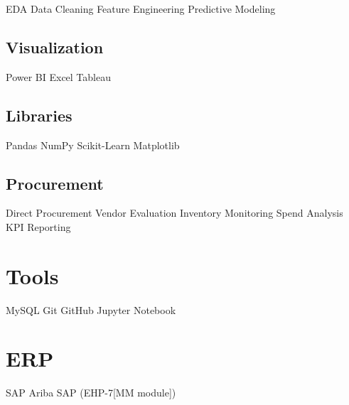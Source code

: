 \documentclass[]{deedy-resume-reversed}
\begin{document}
\begin{minipage}[t]{0.30\textwidth}
\textbullet{} EDA \textbullet{} Data Cleaning \textbullet{} Feature Engineering \textbullet{} Predictive Modeling

\sectionsep

\subsection{Visualization}

\textbullet{} Power BI \textbullet{} Excel \textbullet{} Tableau

\sectionsep

\subsection{Libraries}

\textbullet{} Pandas \textbullet{} NumPy \textbullet{} Scikit-Learn 
\textbullet{} Matplotlib

\sectionsep

\subsection{Procurement}

\textbullet{} Direct Procurement \textbullet{} Vendor Evaluation \textbullet{} Inventory Monitoring  \textbullet{} Spend Analysis \textbullet{} KPI Reporting


\sectionsep


\section{Tools}

\textbullet{} MySQL \textbullet{} Git \textbullet{} GitHub \textbullet{} Jupyter Notebook

\sectionsep


\section{ERP}

\textbullet{} SAP Ariba \textbullet{} SAP
(EHP-7[MM module])

\sectionsep



\end{minipage}
\end{document}
